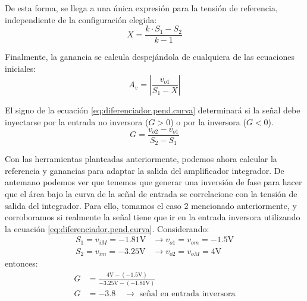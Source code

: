 De esta forma, se llega a una única expresión para la tensión de referencia, independiente de la configuración elegida:
\begin{equation}
    X = \frac{k \cdot S_1 - S_2}{k - 1}
    \label{eq:diferenciador.offset}
\end{equation}

Finalmente, la ganancia se calcula despejándola de cualquiera de las ecuaciones iniciales: 
\begin{equation}
  A_v = \left| \frac{v_{o1}}{S_1 - X} \right|
  \label{eq:diferenciador.ganancia}
\end{equation}

El signo de la ecuación \ref{eq:diferenciador.pend.curva} determinará si la señal debe inyectarse por la entrada no
inversora ($G > 0$) o por la inversora ($G < 0$).
\begin{equation}
  G = \frac{v_{o2} - v_{o1}}{S_2 - S_1}
  \label{eq:diferenciador.pend.curva}
\end{equation}

Con las herramientas planteadas anteriormente, podemos ahora calcular la referencia y ganancias para adaptar la salida
del amplificador integrador. De antemano podemos ver que tenemos que generar una inversión de fase para hacer que el
área bajo la curva de la señal de entrada se correlacione con la tensión de salida del integrador. Para ello, tomamos el
caso 2 mencionado anteriormente, y corroboramos si realmente la señal tiene que ir en la entrada inversora utilizando la
ecuación \ref{eq:diferenciador.pend.curva}. Considerando:
\begin{align*}
  S_1 = v_{iM} = -1.81 \si{\volt} &\to v_{o1} = v_{om} = -1.5 \si{\volt} \\
  S_2 = v_{im} = -3.25 \si{\volt} &\to v_{o2} = v_{oM} = 4 \si{\volt}
\end{align*}
entonces:
\begin{align*}
  G &= \frac{4 \si{\volt} - (-1.5\si{\volt})}{-3.25\si{\volt} - (-1.81\si{\volt})} \\
  G &= -3.8 \quad \to \text{ señal en entrada inversora}
\end{align*}

